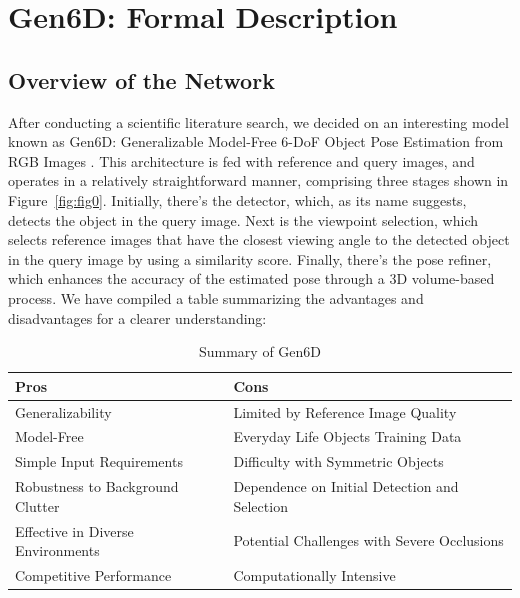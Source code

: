 
\chapter{Gen6D: Formal Description}\label{chapter:gen6d_formal_description}

\section{Overview of the Network}
After conducting a scientific literature search, we decided on an interesting model known as Gen6D: Generalizable Model-Free 6-\ac{DoF} Object Pose Estimation from RGB Images \cite{liu2023gen6d}. This architecture is fed with reference and query images, and operates in a relatively straightforward manner, comprising three stages shown in Figure~\ref{fig:fig0}. Initially, there's the detector, which, as its name suggests, detects the object in the query image. Next is the viewpoint selection, which selects reference images that have the closest viewing angle to the detected object in the query image by using a similarity score. Finally, there's the pose refiner, which enhances the accuracy of the estimated pose through a 3D volume-based process. We have compiled a table summarizing the advantages and disadvantages for a clearer understanding:

\begin{table}[htpb]
  \caption[Example table]{Summary of Gen6D}\label{tab:sample}
  \centering
  \small
  \begin{tabular}{l | l}
    \toprule
      Pros & Cons \\
    \midrule
      Generalizability & Limited by Reference Image Quality \\
      Model-Free & Everyday Life Objects Training Data \\
      Simple Input Requirements & Difficulty with Symmetric Objects \\
      Robustness to Background Clutter & Dependence on Initial Detection and Selection \\
      Effective in Diverse Environments & Potential Challenges with Severe Occlusions \\
      Competitive Performance & Computationally Intensive \\
    \bottomrule
  \end{tabular}
  \label{tab:tab}
\end{table}

